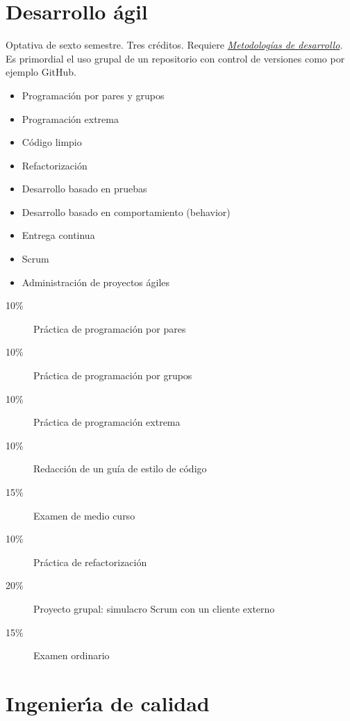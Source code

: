 \documentclass{article}
\begin{document}
\begin{multicols}{4}
\vfill\null \columnbreak

\hypertarget{da}{\section*{Desarrollo \'{a}gil}} 

Optativa de sexto semestre. Tres cr\'{e}ditos. Requiere
\hyperlink{mdd}{\em Metodolog\'{i}as de desarrollo}.  Es primordial el
uso grupal de un repositorio con control de versiones como por ejemplo
GitHub.

\begin{itemize}
\item{Programaci\'{o}n por pares y grupos}
\item{Programaci\'{o}n extrema}
\item{C\'{o}digo limpio}
\item{Refactorizaci\'{o}n}
\item{Desarrollo basado en pruebas}
\item{Desarrollo basado en comportamiento (behavior)}
\item{Entrega continua}
\item{Scrum}
\item{Administraci\'{o}n de proyectos \'{a}giles}
\end{itemize}

\begin{description}
\item[10\%]{Pr\'{a}ctica de programaci\'{o}n por pares}
\item[10\%]{Pr\'{a}ctica de programaci\'{o}n por grupos}
\item[10\%]{Pr\'{a}ctica de programaci\'{o}n extrema}  
\item[10\%]{Redacci\'{o}n de un gu\'{i}a de estilo de c\'{o}digo}
\item[15\%]{Examen de medio curso}  
\item[10\%]{Pr\'{a}ctica de refactorizaci\'{o}n}
\item[20\%]{Proyecto grupal: simulacro Scrum con un cliente externo}
\item[15\%]{Examen ordinario}
\end{description}  

\vfill\null \columnbreak

\hypertarget{idc}{\section*{Ingenier\'{\i}a de calidad}} 


\end{multicols}
\end{document}
